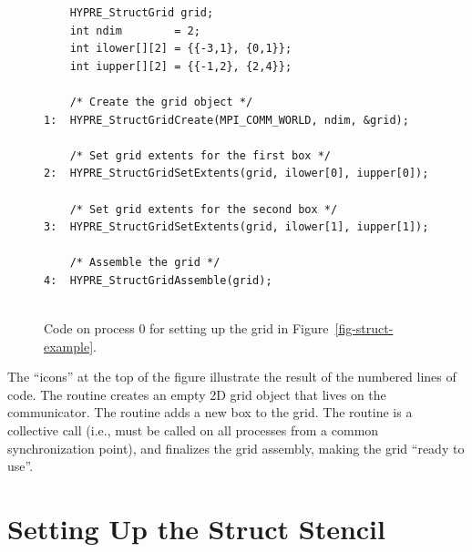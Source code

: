 \begin{figure}
\begin{minipage}{0.7\textwidth}
\begin{verbatim}
    HYPRE_StructGrid grid;
    int ndim        = 2;
    int ilower[][2] = {{-3,1}, {0,1}};
    int iupper[][2] = {{-1,2}, {2,4}};
   
    /* Create the grid object */
1:  HYPRE_StructGridCreate(MPI_COMM_WORLD, ndim, &grid);
    
    /* Set grid extents for the first box */
2:  HYPRE_StructGridSetExtents(grid, ilower[0], iupper[0]);
    
    /* Set grid extents for the second box */
3:  HYPRE_StructGridSetExtents(grid, ilower[1], iupper[1]);
    
    /* Assemble the grid */
4:  HYPRE_StructGridAssemble(grid);
    
\end{verbatim}
\end{minipage}
\caption{%
Code on process 0 for setting up the grid in Figure~\ref{fig-struct-example}.}
\label{fig-struct-grid}
\end{figure}
The ``icons'' at the top of the figure illustrate the result of the numbered
lines of code.  The  routine creates an empty 2D grid object
that lives on the  communicator.  The 
routine adds a new box to the grid.  The  routine is a
collective call (i.e., must be called on all processes from a common
synchronization point), and finalizes the grid assembly, making the grid
``ready to use''.


\section{Setting Up the Struct Stencil}
\label{sec-Struct-Stencil}

